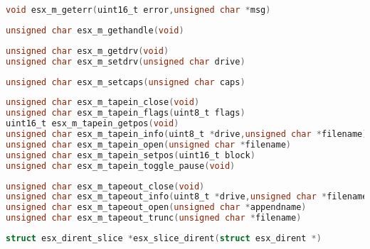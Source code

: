 \documentclass[11pt]{book}
\def\lthtmlcheckvsize{\ifdim\ht\sizebox<\vsize 
  \ifdim\wd\sizebox<\hsize\expandafter\hfill\fi \expandafter\vfill
  \else\expandafter\vss\fi}%
\begin{document}
{\newpage\clearpage
{}%
\begin{lstlisting}[language=C]
void esx_m_geterr(uint16_t error,unsigned char *msg)
\end{lstlisting}%
\lthtmlfigureZ
\lthtmlcheckvsize\clearpage}

{\newpage\clearpage
{}%
\begin{lstlisting}[language=C]
unsigned char esx_m_gethandle(void)
\end{lstlisting}%
\lthtmlfigureZ
\lthtmlcheckvsize\clearpage}

{\newpage\clearpage
{}%
\begin{lstlisting}[language=C]
unsigned char esx_m_getdrv(void)
unsigned char esx_m_setdrv(unsigned char drive)
\end{lstlisting}%
\lthtmlfigureZ
\lthtmlcheckvsize\clearpage}

{\newpage\clearpage
{}%
\begin{lstlisting}[language=C]
unsigned char esx_m_setcaps(unsigned char caps)
\end{lstlisting}%
\lthtmlfigureZ
\lthtmlcheckvsize\clearpage}

{\newpage\clearpage
{}%
\begin{lstlisting}[language=C]
unsigned char esx_m_tapein_close(void)
unsigned char esx_m_tapein_flags(uint8_t flags)
uint16_t esx_m_tapein_getpos(void)
unsigned char esx_m_tapein_info(uint8_t *drive,unsigned char *filename)
unsigned char esx_m_tapein_open(unsigned char *filename)
unsigned char esx_m_tapein_setpos(uint16_t block)
unsigned char esx_m_tapein_toggle_pause(void)
\end{lstlisting}%
\lthtmlfigureZ
\lthtmlcheckvsize\clearpage}

{\newpage\clearpage
{}%
\begin{lstlisting}[language=C]
unsigned char esx_m_tapeout_close(void)
unsigned char esx_m_tapeout_info(uint8_t *drive,unsigned char *filename)
unsigned char esx_m_tapeout_open(unsigned char *appendname)
unsigned char esx_m_tapeout_trunc(unsigned char *filename)
\end{lstlisting}%
\lthtmlfigureZ
\lthtmlcheckvsize\clearpage}

{\newpage\clearpage
{}%
\begin{lstlisting}[language=C]
struct esx_dirent_slice *esx_slice_dirent(struct esx_dirent *)
\end{lstlisting}%
\lthtmlfigureZ
\lthtmlcheckvsize\clearpage}
\end{document}
